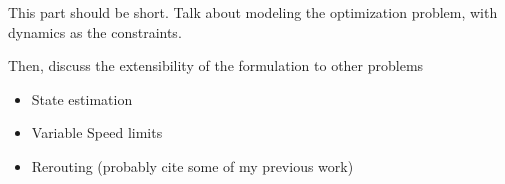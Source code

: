 This part should be short. Talk about modeling the optimization problem, with dynamics as the constraints. 

Then, discuss the extensibility of the formulation to other problems

\begin{itemize}
    \item State estimation
    \item Variable Speed limits
    \item Rerouting (probably cite some of my previous work)
\end{itemize}

